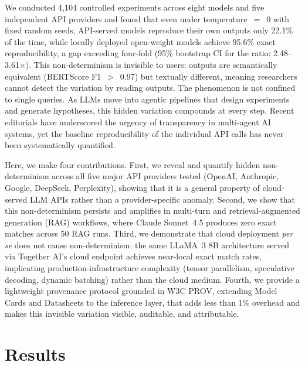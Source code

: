 \documentclass[sn-nature]{sn-jnl}
\begin{document}
We conducted 4,104 controlled experiments across eight models and five independent API providers and found that even under temperature~$=$~0 with fixed random seeds, API-served models reproduce their own outputs only 22.1\% of the time, while locally deployed open-weight models achieve 95.6\% exact reproducibility, a gap exceeding four-fold (95\% bootstrap CI for the ratio: 2.48--3.61$\times$).
This non-determinism is invisible to users: outputs are semantically equivalent (BERTScore F1~$>$~0.97) but textually different, meaning researchers cannot detect the variation by reading outputs.
The phenomenon is not confined to single queries.
As LLMs move into agentic pipelines that design experiments and generate hypotheses\cite{xin2025agentic}, this hidden variation compounds at every step.
Recent editorials have underscored the urgency of transparency in multi-agent AI systems\cite{editorial2026multiagent}, yet the baseline reproducibility of the individual API calls has never been systematically quantified.

Here, we make four contributions.
First, we reveal and quantify hidden non-determinism across all five major API providers tested (OpenAI, Anthropic, Google, DeepSeek, Perplexity), showing that it is a general property of cloud-served LLM APIs rather than a provider-specific anomaly.
Second, we show that this non-determinism persists and amplifies in multi-turn and retrieval-augmented generation (RAG) workflows, where Claude Sonnet~4.5 produces zero exact matches across 50 RAG runs.
Third, we demonstrate that cloud deployment \emph{per se} does not cause non-determinism: the same LLaMA~3 8B architecture served via Together AI's cloud endpoint achieves near-local exact match rates, implicating production-infrastructure complexity (tensor parallelism, speculative decoding, dynamic batching) rather than the cloud medium.
Fourth, we provide a lightweight provenance protocol grounded in W3C PROV\cite{w3cprov2013}, extending Model Cards\cite{mitchell2019model} and Datasheets\cite{gebru2021datasheets} to the inference layer, that adds less than 1\% overhead and makes this invisible variation visible, auditable, and attributable.


\section{Results}\label{sec:results}
\end{document}
